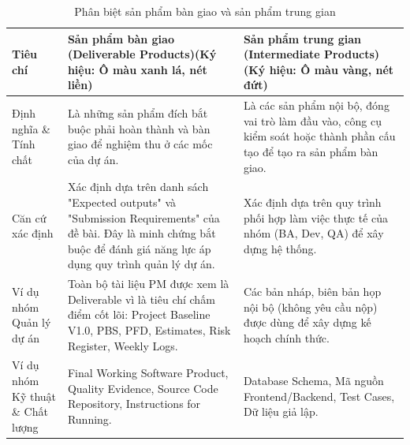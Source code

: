 \begin{table}[H]
\centering
\caption{Phân biệt sản phẩm bàn giao và sản phẩm trung gian}
\small
\renewcommand{\arraystretch}{1.25}
\begin{tabularx}{\textwidth}{|p{2cm}|>{\raggedright\arraybackslash}X|>{\raggedright\arraybackslash}X|}
\hline
\textbf{Tiêu chí} & \textbf{Sản phẩm bàn giao (Deliverable Products)(Ký hiệu: Ô màu xanh lá, nét liền)} & \textbf{Sản phẩm trung gian (Intermediate Products)(Ký hiệu: Ô màu vàng, nét đứt)} \\ \hline
Định nghĩa \& Tính chất & Là những sản phẩm đích bắt buộc phải hoàn thành và bàn giao để nghiệm thu ở các mốc của dự án. & Là các sản phẩm nội bộ, đóng vai trò làm đầu vào, công cụ kiểm soát hoặc thành phần cấu tạo để tạo ra sản phẩm bàn giao. \\ \hline
Căn cứ xác định & Xác định dựa trên danh sách "Expected outputs" và "Submission Requirements" của đề bài. Đây là minh chứng bắt buộc để đánh giá năng lực áp dụng quy trình quản lý dự án. & Xác định dựa trên quy trình phối hợp làm việc thực tế của nhóm (BA, Dev, QA) để xây dựng hệ thống. \\ \hline
Ví dụ nhóm Quản lý dự án & Toàn bộ tài liệu PM được xem là Deliverable vì là tiêu chí chấm điểm cốt lõi: Project Baseline V1.0, PBS, PFD, Estimates, Risk Register, Weekly Logs. & Các bản nháp, biên bản họp nội bộ (không yêu cầu nộp) được dùng để xây dựng kế hoạch chính thức. \\ \hline
Ví dụ nhóm Kỹ thuật \& Chất lượng & Final Working Software Product, Quality Evidence, Source Code Repository, Instructions for Running. & Database Schema, Mã nguồn Frontend/Backend, Test Cases, Dữ liệu giả lập. \\ \hline
\end{tabularx}
\end{table}
